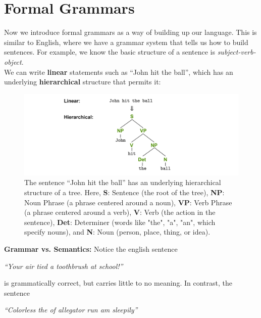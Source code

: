 \section{Formal Grammars}

Now we introduce formal grammars as a way of building up our language.
This is similar to English, where we have a grammar system that tells us how to build sentences.
For example, we know the basic structure of a sentence is \textit{subject-verb-object}. \\

\noindent
We can write \textbf{linear} statements such as ``John hit the ball'', which has an underlying \textbf{hierarchical} structure that permits it:

\begin{figure}[h]
\centering
\includegraphics[width=1\textwidth]{Sections/Formal/eng.png}
\caption{The sentence ``John hit the ball'' has an underlying hierarchical structure of a tree. Here, \textbf{S}: Sentence (the root of the tree), \textbf{NP}: Noun Phrase (a phrase centered around a noun), \textbf{VP}: Verb Phrase (a phrase centered around a verb), \textbf{V}: Verb (the action in the sentence), \textbf{Det}: Determiner (words like "the", "a", "an", which specify nouns), and \textbf{N}: Noun (person, place, thing, or idea).}
\end{figure}

\noindent
\textbf{Grammar vs. Semantics:} Notice the english sentence 

\begin{center}
\Large \textit{``Your air tied a toothbrush at school!''}
\end{center}

\noindent
is grammatically correct, but carries little to no meaning. In contrast, 
the sentence

\begin{center}
\Large \textit{``Colorless the of allegator run am sleepily''}
\end{center}

